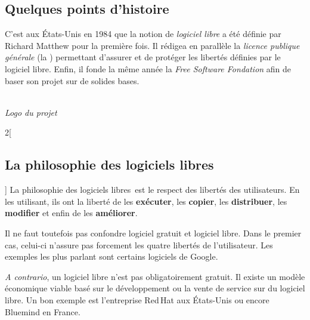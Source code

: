 \newcommand{\lls}{logiciels libres~}


\subsection{Quelques points d’histoire}
\begin{minipage}{0.7\textwidth}
C’est aux États-Unis en 1984 que la notion de \textcolor{Cdl}{\textit{logiciel libre}} a été définie par \textcolor{Cdl}{Richard Matthew } pour la première fois. Il rédigea en parallèle la \textcolor{Cdl}{\textit{licence publique générale }} (la ) permettant d’assurer et de protéger les libertés définies par le logiciel libre. Enfin, il fonde la même année la \textcolor{Cdl}{\textit{Free Software Fondation}} afin de baser son projet sur de solides bases.
\end{minipage}
\begin{minipage}{0.3\textwidth}
\begin{center}
\\
\textit{Logo du projet }
\end{center}
\end{minipage}

\begin{multicols}{2}[\subsection{La philosophie des logiciels libres}]
La philosophie des \lls est le respect des libertés des utilisateurs. En les utilisant, ils ont la liberté de les \textbf{exécuter}, les \textbf{copier}, les \textbf{distribuer}, les \textbf{modifier} et enfin de les \textbf{améliorer}.

Il ne faut toutefois pas confondre logiciel gratuit et logiciel libre. Dans le premier cas, celui-ci n’assure pas forcement les quatre libertés de l’utilisateur. Les exemples les plus parlant sont certains logiciels de Google.

\textit{A contrario}, un  logiciel libre n’est pas obligatoirement gratuit. Il existe un modèle économique viable basé sur le développement ou la vente de service sur du logiciel libre. Un bon exemple est l’entreprise Red\,Hat aux États-Unis ou encore Bluemind en France.
\end{multicols}

